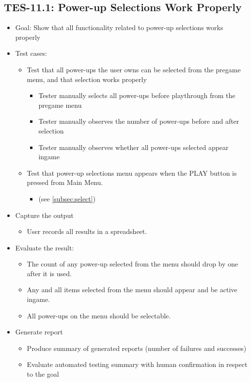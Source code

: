 \subsection{TES-11.1: Power-up Selections Work Properly }
\label{subsec:power-ups}
\begin{itemize}
\item Goal: Show that all functionality related to power-up selections works properly

\item Test cases: 
\begin{itemize}
\item Test that all power-ups the user owns can be selected from the pregame menu, and that selection works properly
\begin{itemize}
\item Tester manually selects all power-ups before playthrough from the pregame menu
\item Tester manually observes the number of power-ups before and after selection
\item Tester manually observes whether all power-ups selected appear ingame
\end{itemize}
\item Test that power-up selections menu appears when the PLAY button is pressed from Main Menu.
\begin{itemize}
\item (see \ref{subsec:select})
\end{itemize}
\end{itemize}

\item Capture the output 
\begin{itemize}
\item User records all results in a spreadsheet.
\end{itemize}

\item Evaluate the result: 
\begin{itemize}
\item The count of any power-up selected from the menu should drop by one after it is used.
\item Any and all items selected from the menu should appear and be active ingame.
\item All power-ups on the menu should be selectable.
\end{itemize}

\item Generate report 
\begin{itemize}
\item Produce summary of generated reports (number of failures and successes)
\item Evaluate automated testing summary with human confirmation in respect to the goal
\end{itemize}
\end{itemize}

